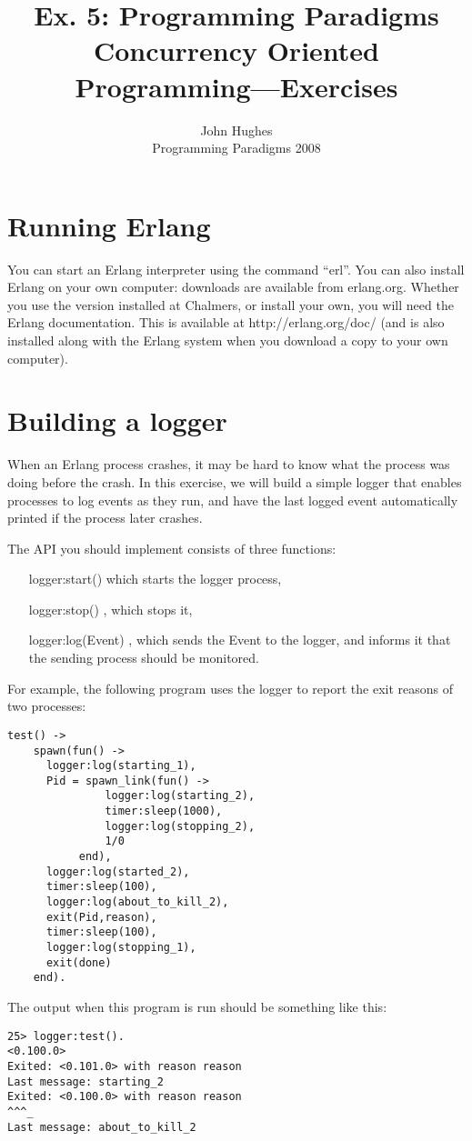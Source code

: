 \documentclass{article}
\newcommand{\courseinfo}{ John Hughes \\ Programming Paradigms 2008 }
\begin{document}
\title{Ex. 5: Programming Paradigms 
\\
Concurrency Oriented Programming—Exercises}
\author{\courseinfo}
\date{}
\maketitle

\section{Running Erlang}

You can start an Erlang interpreter using the command ``erl''. You can also install Erlang on your own computer: downloads are available from erlang.org. Whether you use the version installed at Chalmers, or install your own, you will need the Erlang documentation. This is available at http://erlang.org/doc/ (and is also installed along with the Erlang system when you download a copy to your own computer).


\section{Building a logger}

When an Erlang process crashes, it may be hard to know what the
process was doing before the crash. In this exercise, we will build a
simple logger that enables processes to log events as they run, and
have the last logged event automatically printed if the process later
crashes.

The API you should implement consists of three functions:

\begin{itemize}
\item[logger:start()] which starts the logger process,
\item[logger:stop()], which stops it,
\item[logger:log(Event)], which sends the Event to the logger, and informs it that the sending process should be monitored.
\end{itemize}

For example, the following program uses the logger to report the exit reasons of two processes:
\begin{verbatim}
test() ->
    spawn(fun() ->
	  logger:log(starting_1),
	  Pid = spawn_link(fun() ->
			   logger:log(starting_2),
			   timer:sleep(1000),
			   logger:log(stopping_2),
			   1/0
		   end),
	  logger:log(started_2),
	  timer:sleep(100),
	  logger:log(about_to_kill_2),
	  exit(Pid,reason),
	  timer:sleep(100),
	  logger:log(stopping_1),
	  exit(done)
	end).
\end{verbatim}
The output when this program is run should be something  like this:
\begin{verbatim}
25> logger:test().
<0.100.0>
Exited: <0.101.0> with reason reason
Last message: starting_2
Exited: <0.100.0> with reason reason
^^^_
Last message: about_to_kill_2
\end{verbatim}
\end{document}
